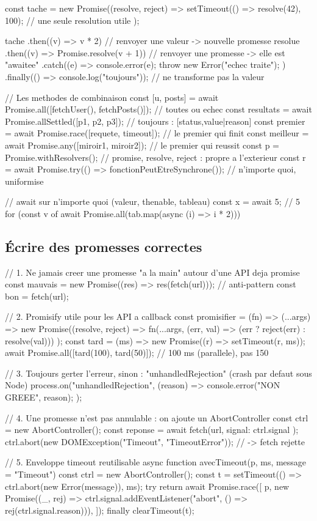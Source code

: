 \begin{codejs}
const tache = new Promise((resolve, reject) => {
  setTimeout(() => resolve(42), 100);           // une seule resolution utile
});

tache
  .then((v) => v * 2)              // renvoyer une valeur -> nouvelle promesse resolue
  .then((v) => Promise.resolve(v + 1))   // renvoyer une promesse -> elle est "awaitee"
  .catch((e) => { console.error(e); throw new Error("echec traite"); })
  .finally(() => console.log("toujours"));   // ne transforme pas la valeur

// Les methodes de combinaison
const [u, posts] = await Promise.all([fetchUser(), fetchPosts()]);   // toutes ou echec
const resultats = await Promise.allSettled([p1, p2, p3]);  // toujours : [{status,value|reason}]
const premier = await Promise.race([requete, timeout]);            // le premier qui finit
const meilleur = await Promise.any([miroir1, miroir2]);            // le premier qui reussit
const p = Promise.withResolvers();            // {promise, resolve, reject} : propre a l'exterieur
const r = await Promise.try(() => fonctionPeutEtreSynchrone());    // n'importe quoi, uniformise

// await sur n'importe quoi (valeur, thenable, tableau)
const x = await 5;                 // 5
for (const v of await Promise.all(tab.map(async (i) => i * 2))) {}
\end{codejs}

\subsection{\'Ecrire des promesses correctes}

\begin{codejs}
// 1. Ne jamais creer une promesse "a la main" autour d'une API deja promise
const mauvais = new Promise((res) => res(fetch(url)));      // anti-pattern
const bon = fetch(url);

// 2. Promisify utile pour les API a callback
const promisifier = (fn) => (...args) =>
  new Promise((resolve, reject) =>
    fn(...args, (err, val) => (err ? reject(err) : resolve(val)))
  );
const tard = (ms) => new Promise((r) => setTimeout(r, ms));
await Promise.all([tard(100), tard(50)]);     // 100 ms (parallele), pas 150

// 3. Toujours gerter l'erreur, sinon : "unhandledRejection" (crash par defaut sous Node)
process.on("unhandledRejection", (reason) => { console.error("NON GREEE", reason); });

// 4. Une promesse n'est pas annulable : on ajoute un AbortController
const ctrl = new AbortController();
const reponse = await fetch(url, { signal: ctrl.signal });
ctrl.abort(new DOMException("Timeout", "TimeoutError"));  // -> fetch rejette

// 5. Enveloppe timeout reutilisable
async function avecTimeout(p, ms, message = "Timeout") {
  const ctrl = new AbortController();
  const t = setTimeout(() => ctrl.abort(new Error(message)), ms);
  try {
    return await Promise.race([
      p,
      new Promise((_, rej) => ctrl.signal.addEventListener("abort", () => rej(ctrl.signal.reason))),
    ]);
  } finally { clearTimeout(t); }
}
\end{codejs}

